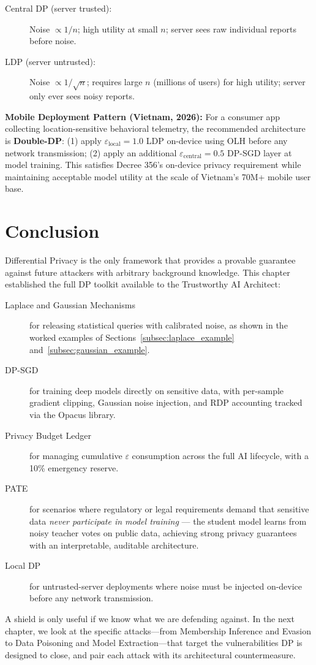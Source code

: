 \begin{description}
  \item[Central DP (server trusted):] Noise $\propto 1/n$; high utility at small $n$; server sees raw individual reports before noise.
  \item[LDP (server untrusted):] Noise $\propto 1/\sqrt{n}$; requires large $n$ (millions of users) for high utility; server only ever sees noisy reports.
\end{description}

\begin{svgraybox}
\textbf{Mobile Deployment Pattern (Vietnam, 2026):} For a consumer app collecting location-sensitive behavioral telemetry, the recommended architecture is \textbf{Double-DP}: (1) apply $\varepsilon_\mathrm{local} = 1.0$ LDP on-device using OLH before any network transmission; (2) apply an additional $\varepsilon_\mathrm{central} = 0.5$ DP-SGD layer at model training. This satisfies Decree 356's on-device privacy requirement while maintaining acceptable model utility at the scale of Vietnam's 70M+ mobile user base.
\end{svgraybox}

\section{Conclusion}
\label{sec:conclusion_dp}

Differential Privacy is the only framework that provides a provable guarantee against future attackers with arbitrary background knowledge. This chapter established the full DP toolkit available to the Trustworthy AI Architect:

\begin{description}
  \item[Laplace and Gaussian Mechanisms] for releasing statistical queries with calibrated noise, as shown in the worked examples of Sections~\ref{subsec:laplace_example} and~\ref{subsec:gaussian_example}.
  \item[DP-SGD] for training deep models directly on sensitive data, with per-sample gradient clipping, Gaussian noise injection, and RDP accounting tracked via the Opacus library.
  \item[Privacy Budget Ledger] for managing cumulative $\varepsilon$ consumption across the full AI lifecycle, with a 10\% emergency reserve.
  \item[PATE] for scenarios where regulatory or legal requirements demand that sensitive data \emph{never participate in model training} — the student model learns from noisy teacher votes on public data, achieving strong privacy guarantees with an interpretable, auditable architecture.
  \item[Local DP] for untrusted-server deployments where noise must be injected on-device before any network transmission.
\end{description}

A shield is only useful if we know what we are defending against. In the next chapter, we look at the specific attacks---from Membership Inference and Evasion to Data Poisoning and Model Extraction---that target the vulnerabilities DP is designed to close, and pair each attack with its architectural countermeasure.


